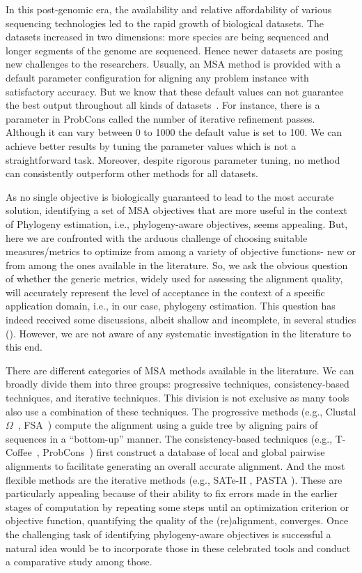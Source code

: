 In this post-genomic era, the availability and relative affordability of various sequencing technologies led to the rapid growth of biological datasets. The datasets increased in two dimensions: more species are being sequenced and longer segments of the genome are sequenced.
Hence newer datasets are posing new challenges to the researchers. Usually, an MSA method is provided with a default parameter configuration for aligning any problem instance with satisfactory accuracy. But we know that these default values can not guarantee the best output throughout all kinds of datasets~\citep{rubio2018characteristic}. For instance, there is a parameter in ProbCons called the number of iterative refinement passes. Although it can vary between 0 to 1000 the default value is set to 100. We can achieve better results by tuning the parameter values which is not a straightforward task. Moreover, despite rigorous parameter tuning, no method can consistently outperform other methods for all datasets. 

As no single objective is biologically guaranteed to lead to the most accurate solution, identifying a set of MSA objectives that are more useful in the context of Phylogeny estimation, i.e., phylogeny-aware objectives, seems appealing. But, here we are confronted with the arduous challenge of choosing suitable measures/metrics to optimize from among a variety of objective functions- new or from among the ones available in the literature. So, we ask the obvious question of whether the generic metrics, widely used for assessing the alignment quality, will accurately represent the level of acceptance in the context of a specific application domain, i.e., in our case, phylogeny estimation. This question has indeed received some discussions, albeit shallow and incomplete, in several studies (\cite{mirarab2015pasta, liu2009rapid}). However, we are not aware of any systematic investigation in the literature to this end.

There are different categories of MSA methods available in the literature. We can broadly divide them into three groups: progressive techniques, consistency-based techniques, and iterative techniques. This division is not exclusive as many tools also use a combination of these techniques. The progressive methods (e.g., Clustal $\Omega$~\citep{sievers2011fast}, FSA~\citep{bradley2009fast}) compute the alignment using a guide tree by aligning pairs of sequences in a ``bottom-up'' manner. The consistency-based techniques (e.g., T-Coffee~\citep{notredame2000t}, ProbCons~\citep{do2005probcons}) first construct a database of local and global pairwise alignments to facilitate generating an overall accurate alignment. 
And the most flexible methods are the iterative methods (e.g., SATe-II \cite{liu2012sate}, PASTA \cite{mirarab2015pasta}). These are particularly appealing because of their ability to fix errors made in the earlier stages of computation by repeating some steps until an optimization criterion or objective function, quantifying the quality of the (re)alignment, converges. Once the challenging task of identifying phylogeny-aware objectives is successful a natural idea would be to incorporate those in these celebrated tools and conduct a comparative study among those.    

